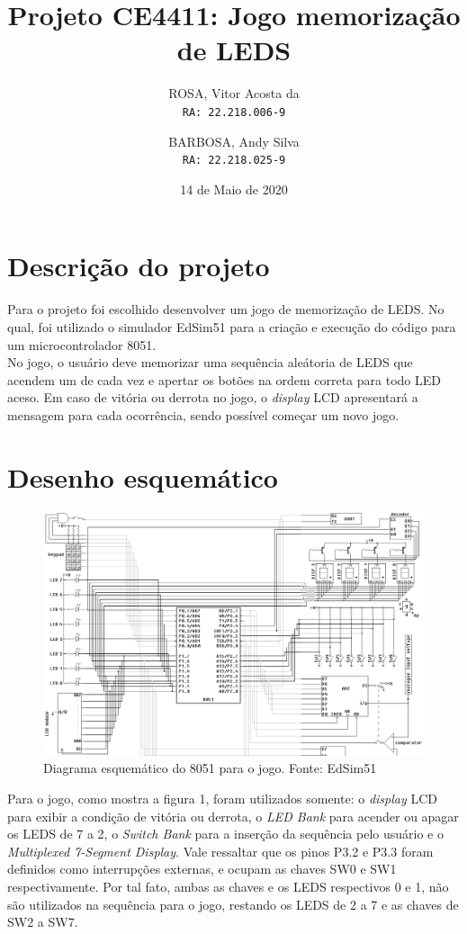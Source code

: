 \documentclass{article}
\title{\textbf{Projeto CE4411:} Jogo memorização de LEDS}
\author{
  ROSA, Vitor Acosta da\\
  \texttt{RA: 22.218.006-9}
  \and
  BARBOSA, Andy Silva\\
  \texttt{RA: 22.218.025-9}
}
\date{14 de Maio de 2020}
\begin{document}
\maketitle
\section{Descrição do projeto}
Para o projeto foi escolhido desenvolver um jogo de memorização de LEDS. No qual, foi utilizado o simulador EdSim51 para a criação e execução do código para um microcontrolador 8051.\\
No jogo, o usuário deve memorizar uma sequência aleátoria de LEDS que acendem um de cada vez e apertar os botões na ordem correta para todo LED aceso. Em caso de vitória ou derrota no jogo, o \textit{display} LCD apresentará a mensagem para cada ocorrência, sendo possível começar um novo jogo.
\section{Desenho esquemático}
\begin{figure}[H]
\hspace*{-1.5in}
\includegraphics[scale=0.5]{diagrama.png}
\caption{Diagrama esquemático do 8051 para o jogo. Fonte: EdSim51}
\end{figure}
Para o jogo, como mostra a figura 1, foram utilizados somente: o \textit{display} LCD para exibir a condição de vitória ou derrota, o \textit{LED Bank} para acender ou apagar os LEDS de 7 a 2, o \textit{Switch Bank} para a inserção da sequência pelo usuário e o \textit{Multiplexed 7-Segment Display}.\newline
Vale ressaltar que os pinos P3.2 e P3.3 foram definidos como interrupções externas, e ocupam as chaves SW0 e SW1 respectivamente. Por tal fato, ambas as chaves e os LEDS respectivos 0 e 1, não são utilizados na sequência para o jogo, restando os LEDS de 2 a 7 e as chaves de SW2 a SW7.
\newpage
\end{document}
